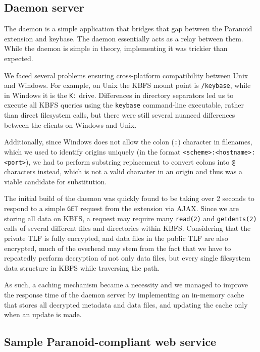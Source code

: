 \documentclass[letterpaper,twocolumn,10pt]{article}
\begin{document}
\subsection{Daemon server}

The daemon is a simple application that bridges that gap between the Paranoid extension and keybase. The daemon essentially acts as a relay between them. While the daemon is simple in theory, implementing it was trickier than expected.

We faced several problems ensuring cross-platform compatibility between Unix and Windows. For example, on Unix the KBFS mount point is \texttt{/keybase}, while in Windows it is the \texttt{K:} drive. Differences in directory separators led us to execute all KBFS queries using the \texttt{keybase} command-line executable, rather than direct filesystem calls, but there were still several nuanced differences between the clients on Windows and Unix.

Additionally, since Windows does not allow the colon (\texttt{:}) character in filenames, which we used to identify origins uniquely (in the format \texttt{<scheme>:<hostname>:<port>}), we had to perform substring replacement to convert colons into \texttt{@} characters instead, which is not a valid character in an origin and thus was a viable candidate for substitution.

The initial build of the daemon was quickly found to be taking over 2 seconds to respond to a simple \texttt{GET} request from the extension via AJAX. Since we are storing all data on KBFS, a request may require many \texttt{read(2)} and \texttt{getdents(2)} calls of several different files and directories within KBFS. Considering that the private TLF is fully encrypted, and data files in the public TLF are also encrypted, much of the overhead may stem from the fact that we have to repeatedly perform decryption of not only data files, but every single filesystem data structure in KBFS while traversing the path.

As such, a caching mechanism became a necessity and we managed to improve the response time of the daemon server by implementing an in-memory cache that stores all decrypted metadata and data files, and updating the cache only when an update is made.

\subsection{Sample Paranoid-compliant web service}
\end{document}
